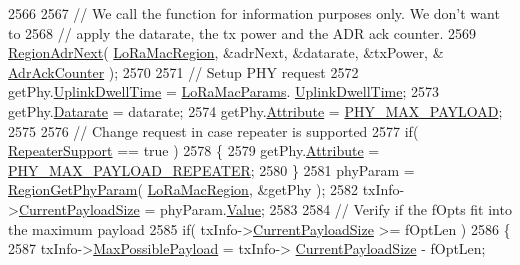 \begin{DoxyCode}
2566 
2567     \textcolor{comment}{// We call the function for information purposes only. We don't want to}
2568     \textcolor{comment}{// apply the datarate, the tx power and the ADR ack counter.}
2569     \mbox{\hyperlink{group___r_e_g_i_o_n_ga08cac64beeadd0555460ca5e756a0792}{RegionAdrNext}}( \mbox{\hyperlink{_lo_ra_mac_8c_ab3e53bd4a0f4e547c9dbf450406acfe5}{LoRaMacRegion}}, &adrNext, &datarate, &txPower, &
      \mbox{\hyperlink{_lo_ra_mac_8c_a24f0356a3491bf07be9ac99ffa33896a}{AdrAckCounter}} );
2570 
2571     \textcolor{comment}{// Setup PHY request}
2572     getPhy.\mbox{\hyperlink{structs_get_phy_params_a0e6663762d6f9173bc8d8cb018f8f17a}{UplinkDwellTime}} = \mbox{\hyperlink{_lo_ra_mac_8c_a4ae7d4019f8156167d8bcb97dff69a41}{LoRaMacParams}}.
      \mbox{\hyperlink{structs_lo_ra_mac_params_a0e6663762d6f9173bc8d8cb018f8f17a}{UplinkDwellTime}};
2573     getPhy.\mbox{\hyperlink{structs_get_phy_params_ae2f6080f3aa0e9485c55513ca56bb24d}{Datarate}} = datarate;
2574     getPhy.\mbox{\hyperlink{structs_get_phy_params_abdcb168ffd6913b85e2f635d7a475f2d}{Attribute}} = \mbox{\hyperlink{group___r_e_g_i_o_n_gga51cbe8f5433d914fe9cf81b451de2c2dad671e2651e42de26927910282c6b2781}{PHY\_MAX\_PAYLOAD}};
2575 
2576     \textcolor{comment}{// Change request in case repeater is supported}
2577     \textcolor{keywordflow}{if}( \mbox{\hyperlink{_lo_ra_mac_8c_a037bdbc41e8b3deeaab3684cf4b23f66}{RepeaterSupport}} == \textcolor{keyword}{true} )
2578     \{
2579         getPhy.\mbox{\hyperlink{structs_get_phy_params_abdcb168ffd6913b85e2f635d7a475f2d}{Attribute}} = \mbox{\hyperlink{group___r_e_g_i_o_n_gga51cbe8f5433d914fe9cf81b451de2c2da8a3b9e5ad2604232fd1f8781658452f3}{PHY\_MAX\_PAYLOAD\_REPEATER}};
2580     \}
2581     phyParam = \mbox{\hyperlink{group___r_e_g_i_o_n_gafbd084611ba512035a6cbe7f3aa5857b}{RegionGetPhyParam}}( \mbox{\hyperlink{_lo_ra_mac_8c_ab3e53bd4a0f4e547c9dbf450406acfe5}{LoRaMacRegion}}, &getPhy );
2582     txInfo->\mbox{\hyperlink{structs_lo_ra_mac_tx_info_afd5874846b1ddb673f84f5f70d1281e2}{CurrentPayloadSize}} = phyParam.\mbox{\hyperlink{unionu_phy_param_a8e0dcce3428a8051614e852b8836d0d1}{Value}};
2583 
2584     \textcolor{comment}{// Verify if the fOpts fit into the maximum payload}
2585     \textcolor{keywordflow}{if}( txInfo->\mbox{\hyperlink{structs_lo_ra_mac_tx_info_afd5874846b1ddb673f84f5f70d1281e2}{CurrentPayloadSize}} >= fOptLen )
2586     \{
2587         txInfo->\mbox{\hyperlink{structs_lo_ra_mac_tx_info_aa2c8329cf5f4dd8fe4b1563a40a3f642}{MaxPossiblePayload}} = txInfo->
      \mbox{\hyperlink{structs_lo_ra_mac_tx_info_afd5874846b1ddb673f84f5f70d1281e2}{CurrentPayloadSize}} - fOptLen;

\end{DoxyCode}
